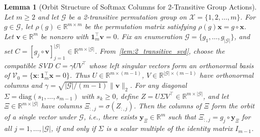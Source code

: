 \documentclass[11pt]{article}
\newtheorem{lemma}{Lemma}
\begin{document}
\begin{lemma}[Orbit Structure of Softmax Columns for 2-Transitive Group Actions]
\label{lem:orbit_S_softmax_2_transitive}
Let \(m \ge 2\) and let \(\mathcal G\) be a 2-transitive permutation group on \(\mathcal X=\{1,2,\ldots,m\}\). For \(g\in \mathcal G\), let \(\rho(g)\in\mathbb{R}^{m\times m}\) be the permutation matrix satisfying \(\rho(g)\boldsymbol{x}=g\circ\boldsymbol{x}\). Let \(\boldsymbol{v}\in\mathbb{R}^m\) be nonzero with \(\boldsymbol{1}_m^{\top}\boldsymbol{v}=0\). Fix an enumeration \(\mathcal G=\{g_1,\ldots,g_{|\mathcal G|}\}\), and set \(C=[g_j\circ\boldsymbol{v}]_{j=1}^{|\mathcal G|}\in\mathbb{R}^{m\times |\mathcal G|}\). From~\cref{lem:2_transitive_svd}, choose the compatible SVD \(C=\gamma U V^{\top}\) whose left singular vectors form an orthonormal basis of \(\mathcal V_0=\{\boldsymbol{x}:\boldsymbol{1}_m^\top \boldsymbol{x}=0\}\). Thus \(U\in\mathbb{R}^{m\times(m-1)}\), \(V\in\mathbb{R}^{|\mathcal G|\times(m-1)}\) have orthonormal columns and \(\gamma=\sqrt{|\mathcal G|/(m-1)}\|\boldsymbol{v}\|_2\). For any diagonal \(\Sigma=\mathrm{diag}(s_1,\ldots,s_{m-1})\) with \(s_k\ge 0\), define \(Z=U\Sigma V^{\top}\in\mathbb{R}^{m\times |\mathcal G|}\), and let \(\Xi\in\mathbb{R}^{m\times|\mathcal G|}\) have columns \(\Xi_{:,j}=\sigma(Z_{:,j})\). Then the columns of \(\Xi\) form the orbit of a single vector under \(\mathcal G\), i.e., there exists \(\boldsymbol{y}_{\Xi} \in \mathbb{R}^m\) such that \(\Xi_{:,j} = g_j\circ\boldsymbol{y}_{\Xi}\) for all \(j=1,\ldots,|\mathcal G|\), if and only if \(\Sigma\) is a scalar multiple of the identity matrix \(I_{m-1}\).
\end{lemma}
\end{document}
